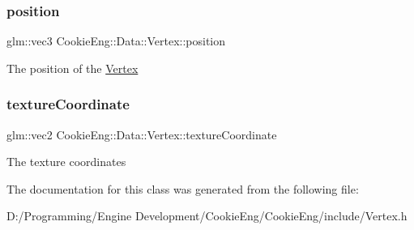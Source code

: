 \subsubsection{\texorpdfstring{position}{position}}
{\footnotesize\ttfamily glm\+::vec3 Cookie\+Eng\+::\+Data\+::\+Vertex\+::position}

The position of the \hyperlink{struct_cookie_eng_1_1_data_1_1_vertex}{Vertex} \mbox{\label{struct_cookie_eng_1_1_data_1_1_vertex_aed17d27b7219642e7937808547f18adf}} 
\subsubsection{\texorpdfstring{texture\+Coordinate}{textureCoordinate}}
{\footnotesize\ttfamily glm\+::vec2 Cookie\+Eng\+::\+Data\+::\+Vertex\+::texture\+Coordinate}

The texture coordinates 

The documentation for this class was generated from the following file\+:\begin{DoxyCompactItemize}
\item 
D\+:/\+Programming/\+Engine Development/\+Cookie\+Eng/\+Cookie\+Eng/include/Vertex.\+h\end{DoxyCompactItemize}
